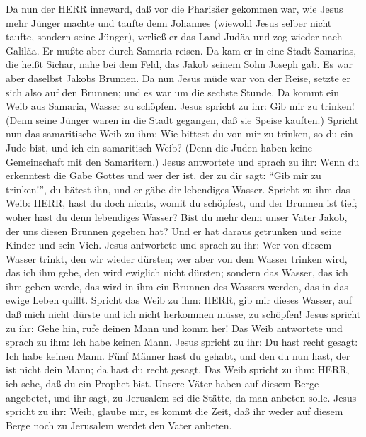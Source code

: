  Da nun der HERR inneward, daß vor die Pharisäer gekommen
war, wie Jesus mehr Jünger machte und taufte denn Johannes 
(wiewohl Jesus selber nicht taufte, sondern seine Jünger), 
verließ er das Land Judäa und zog wieder nach Galiläa.  Er
mußte aber durch Samaria reisen.  Da kam er in eine Stadt
Samarias, die heißt Sichar, nahe bei dem Feld, das Jakob seinem Sohn
Joseph gab.  Es war aber daselbst Jakobs Brunnen. Da nun
Jesus müde war von der Reise, setzte er sich also auf den Brunnen; und
es war um die sechste Stunde.  Da kommt ein Weib aus
Samaria, Wasser zu schöpfen. Jesus spricht zu ihr: Gib mir zu trinken!
 (Denn seine Jünger waren in die Stadt gegangen, daß sie
Speise kauften.)  Spricht nun das samaritische Weib zu ihm:
Wie bittest du von mir zu trinken, so du ein Jude bist, und ich ein
samaritisch Weib? (Denn die Juden haben keine Gemeinschaft mit den
Samaritern.)  Jesus antwortete und sprach zu ihr: Wenn du
erkenntest die Gabe Gottes und wer der ist, der zu dir sagt: ``Gib mir
zu trinken!'', du bätest ihn, und er gäbe dir lebendiges Wasser.
 Spricht zu ihm das Weib: HERR, hast du doch nichts, womit
du schöpfest, und der Brunnen ist tief; woher hast du denn lebendiges
Wasser?  Bist du mehr denn unser Vater Jakob, der uns
diesen Brunnen gegeben hat? Und er hat daraus getrunken und seine Kinder
und sein Vieh.  Jesus antwortete und sprach zu ihr: Wer von
diesem Wasser trinkt, den wir wieder dürsten;  wer aber von
dem Wasser trinken wird, das ich ihm gebe, den wird ewiglich nicht
dürsten; sondern das Wasser, das ich ihm geben werde, das wird in ihm
ein Brunnen des Wassers werden, das in das ewige Leben quillt.
 Spricht das Weib zu ihm: HERR, gib mir dieses Wasser, auf
daß mich nicht dürste und ich nicht herkommen müsse, zu schöpfen!
 Jesus spricht zu ihr: Gehe hin, rufe deinen Mann und komm
her!  Das Weib antwortete und sprach zu ihm: Ich habe
keinen Mann. Jesus spricht zu ihr: Du hast recht gesagt: Ich habe keinen
Mann.  Fünf Männer hast du gehabt, und den du nun hast, der
ist nicht dein Mann; da hast du recht gesagt.  Das Weib
spricht zu ihm: HERR, ich sehe, daß du ein Prophet bist. 
Unsere Väter haben auf diesem Berge angebetet, und ihr sagt, zu
Jerusalem sei die Stätte, da man anbeten solle.  Jesus
spricht zu ihr: Weib, glaube mir, es kommt die Zeit, daß ihr weder auf
diesem Berge noch zu Jerusalem werdet den Vater anbeten. 
